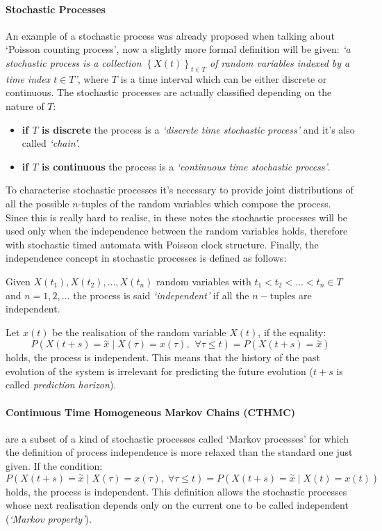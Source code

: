 \documentclass[12pt,a4paper]{article}
\begin{document}
\paragraph{Stochastic Processes}
An example of a stochastic process was already proposed when talking about `Poisson counting process', now a slightly more formal definition will be given: \emph{`a stochastic process is a collection $\left\lbrace X\left(t\right) \right\rbrace_{t\in T} $
of random variables indexed by a time index $t\in T$'}, where $T$ is a time interval which can be either discrete or continuous.
The stochastic processes are actually classified depending on the nature of $T$:
\begin{itemize}
\item \textbf{if $T$ is discrete} the process is a \emph{`discrete time stochastic process'} 
and it's also called \emph{`chain'}.
\item \textbf{if $T$ is continuous} the process is a \emph{`continuous time stochastic process'}.
\end{itemize}
To characterise stochastic processes it's necessary to provide joint distributions of all the possible $n$-tuples of the random variables which compose the process. Since this is really hard to realise, in these notes the stochastic processes will be used
only when the independence between the random variables holds, therefore with stochastic timed automata with Poisson clock structure. Finally, the independence concept in stochastic processes is defined as follows:

\bigskip
\noindent 
Given $X(t_1), X(t_2),\dots, X(t_n)$ random variables with $t_1<t_2<\dots<t_n \in T$ and $n=1,2,\dots$ the process is said \textit{`independent'} if all the $n-$tuples are independent. 

\bigskip
\noindent 
Let $x(t)$ be the realisation of the random variable $X(t)$, if the equality:
$$
P\left(X\left(t+s\right)=\overset{\sim}{x} \mid X\left(\tau\right)=
x\left(\tau\right),\hspace{5pt}\forall\tau\leq t\right)=
P\left(X\left(t+s\right)=\overset{\sim}{x} \right)
$$
holds, the process is independent. This means that the history of the past evolution of the system is irrelevant for predicting the future evolution ($t+s$ is called \textit{prediction horizon}).
\paragraph{Continuous Time Homogeneous Markov Chains (CTHMC)} are a subset of a kind of stochastic processes called `Markov processes' for which the definition of process independence is more relaxed than the standard one just given. If the condition:
$$
P\left(X(t+s)=\overset{\sim}{x} \mid X(\tau)=
x(\tau),\;\forall\tau\leq t\right)=
P\left(X(t+s)=\overset{\sim}{x} \mid X(t)=x(t)\right)
$$
holds, the process is independent. This definition allows the stochastic processes whose next realisation depends only on the current one to be called independent (\textit{`Markov property'}).
\end{document}
